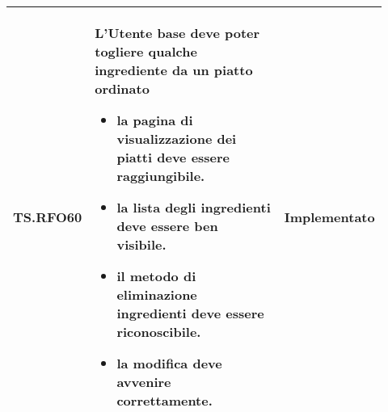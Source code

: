 \begin{longtable}{|p{0.10\linewidth}|p{0.70\linewidth}|p{0.12\linewidth}|}
	\hline
	TS.RFO60                                                                                                                    &
	L’Utente base deve poter togliere qualche ingrediente da un piatto ordinato
	\begin{itemize}
		\item la pagina di visualizzazione dei piatti deve essere raggiungibile.
		\item la lista degli ingredienti deve essere ben visibile.
		\item il metodo di eliminazione ingredienti deve essere riconoscibile.
		\item la modifica deve avvenire correttamente.
	\end{itemize}                                 &
	Implementato                                                                                                                                                            \\
	\hline
\end{longtable}

\fontsize{12}{12}\selectfont

